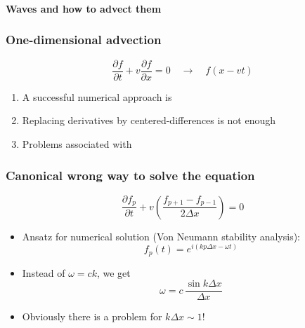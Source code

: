 \begin{frame}
  \frametitle{}
  \begin{center}
    \textbf{\Large Waves and how to advect them }
  \end{center}
\end{frame}

\begin{frame}
  \frametitle{One-dimensional advection}
  
  \begin{center}
  \end{center}

\begin{tcolorbox}
\begin{equation*}
  \frac{\partial f}{\partial t} + v \frac{\partial f}{\partial x} = 0
  \quad \longrightarrow\quad f(x-vt)
 \end{equation*}
\end{tcolorbox}

\begin{enumerate}
\item<2->A successful numerical approach is 
\item<3->Replacing derivatives by centered-differences is not enough
\item<4->Problems associated with 
\end{enumerate}

\end{frame}
\begin{frame}
  \frametitle{Canonical wrong way to solve the equation}
\begin{tcolorbox}
\begin{equation*}
\frac{\partial f_p}{\partial t} + v \left( \frac{f_{p+1}-f_{p-1}}{2\Delta x} \right) = 0
\end{equation*}
\end{tcolorbox}

\begin{itemize}
\item<2-> Ansatz for numerical solution (Von Neumann stability analysis):
\begin{equation*}
 f_p(t) = e^{i(kp\Delta x - \omega t)}  
\end{equation*}
\item<3-> Instead of $\omega = ck$, we get
\begin{equation*}
 \omega = c \, \frac{\sin k\Delta x}{\Delta x}
\end{equation*}
\item<4-> Obviously there is a problem for $k\Delta x \sim 1$!
\end{itemize}
\end{frame}
